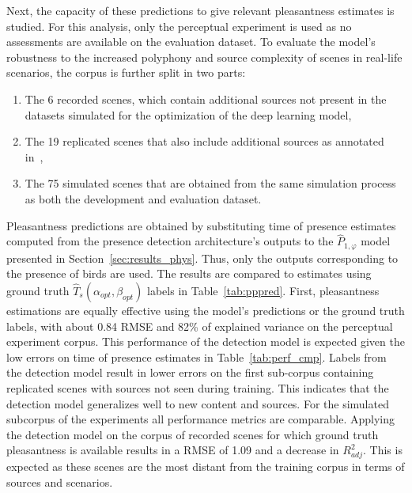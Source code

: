 \documentclass[twocolumn]{article}
\begin{document}
Next, the capacity of these predictions to give relevant pleasantness estimates is studied. For this analysis, only the perceptual experiment is used as no assessments are available on the evaluation dataset. To evaluate the model's robustness to the increased polyphony and source complexity of scenes in real-life scenarios, the corpus is further split in two parts:
\begin{enumerate}
\item The 6 recorded scenes, which contain additional sources not present in the datasets simulated for the optimization of the deep learning model,
\item The 19 replicated scenes that also include additional sources as annotated in~\cite{gloaguen2017},
\item The 75 simulated scenes that are obtained from the same simulation process as both the development and evaluation dataset.
\end{enumerate}
Pleasantness predictions are obtained by substituting time of presence estimates computed from the presence detection architecture's outputs to the $\hat P_{1, \varphi}$ model presented in Section~\ref{sec:results_phys}. Thus, only the outputs corresponding to the presence of birds are used. The results are compared to estimates using ground truth $\hat T_s(\alpha_{opt}, \beta_{opt})$ labels in Table~\ref{tab:pppred}. First, pleasantness estimations are equally effective using the model's predictions or the ground truth labels, with about 0.84 RMSE and 82\% of explained variance on the perceptual experiment corpus. This performance of the detection model is expected given the low errors on time of presence estimates in Table~\ref{tab:perf_cmp}. Labels from the detection model result in lower errors on the first sub-corpus containing replicated scenes with sources not seen during training. This indicates that the detection model generalizes well to new content and sources. For the simulated subcorpus of the experiments all performance metrics are comparable. Applying the detection model on the corpus of recorded scenes for which ground truth pleasantness is available results in a RMSE of 1.09 and a decrease in $R^2_{adj}$. This is expected as these scenes are the most distant from the training corpus in terms of sources and scenarios.
\end{document}
